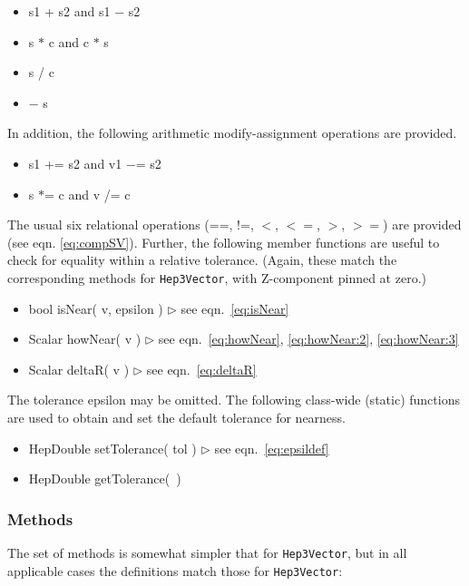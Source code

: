 \documentclass[twoside,12pt]{article}
\def \SV {{\tt Hep3Vector}}
\newcommand {\see}[1] {\hfill$\triangleright$ see eqn.~#1}
\newenvironment{shortlist}{%
\begin{itemize}
\setlength{\itemsep}{0pt}
\setlength{\parskip}{0pt}
}{%
\end{itemize}
}
\begin{document}
\begin{shortlist}
  \item s1 + s2  and  s1 $-$ s2
  \item s $*$ c  and  c $*$ s
  \item s / c
  \item $-$ s
\end{shortlist}

\noindent
In addition, 
the following arithmetic modify-assignment operations are provided.

\begin{shortlist}
  \item s1 += s2  and  v1 $-$= s2
  \item s $*$= c  and  v /= c
\end{shortlist}

\noindent
The usual six relational operations
(==, !=, $<$, $<=$, $>$, $>=$) are provided (see eqn. \ref{eq:compSV}).
Further, the following member functions are useful to check for equality
within a relative tolerance.  (Again, these match the corresponding methods 
for \SV, with Z-component pinned at zero.)

\begin{shortlist}
  \item bool isNear( v, epsilon ) \see{\ref{eq:isNear}}
  \item Scalar howNear( v ) \see{\ref{eq:howNear}, \ref{eq:howNear:2}, \ref{eq:howNear:3}}
  \item Scalar deltaR( v ) \see{\ref{eq:deltaR}}
\end{shortlist}

\noindent
The tolerance epsilon may be omitted.
The following class-wide (static) functions are used
to obtain and set the default tolerance for nearness.

\begin{shortlist}
  \item HepDouble setTolerance( tol )	\see{\ref{eq:epsildef}}
  \item HepDouble getTolerance(~)
\end{shortlist}


\subsubsection{Methods}

The set of methods is somewhat simpler that for \SV, but in all applicable
cases the definitions match those for \SV:
\end{document}

